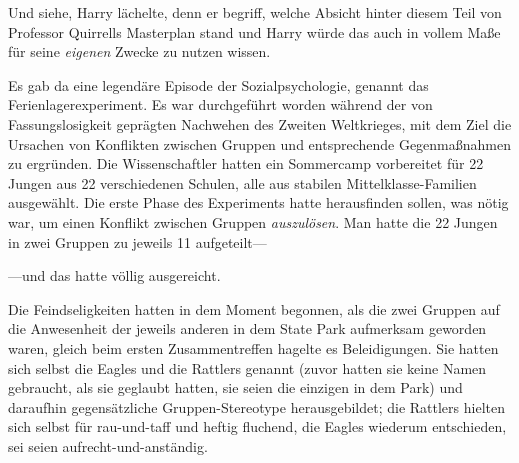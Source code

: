 Und siehe, Harry lächelte, denn er begriff, welche Absicht hinter diesem Teil von Professor Quirrells Masterplan stand und Harry würde das auch in vollem Maße für seine \emph{eigenen} Zwecke zu nutzen wissen.

Es gab da eine legendäre Episode der Sozialpsychologie, genannt das Ferienlagerexperiment. Es war durchgeführt worden während der von Fassungslosigkeit geprägten Nachwehen des Zweiten Weltkrieges, mit dem Ziel die Ursachen von Konflikten zwischen Gruppen und entsprechende Gegenmaßnahmen zu ergründen. Die Wissenschaftler hatten ein Sommercamp vorbereitet für 22 Jungen aus 22 verschiedenen Schulen, alle aus stabilen Mittelklasse-Familien ausgewählt. Die erste Phase des Experiments hatte herausfinden sollen, was nötig war, um einen Konflikt zwischen Gruppen \emph{auszulösen}. Man hatte die 22 Jungen in zwei Gruppen zu jeweils 11 aufgeteilt—

—und das hatte völlig ausgereicht.

Die Feindseligkeiten hatten in dem Moment begonnen, als die zwei Gruppen auf die Anwesenheit der jeweils anderen in dem State Park aufmerksam geworden waren, gleich beim ersten Zusammentreffen hagelte es Beleidigungen. Sie hatten sich selbst die Eagles und die Rattlers genannt (zuvor hatten sie keine Namen gebraucht, als sie geglaubt hatten, sie seien die einzigen in dem Park) und daraufhin gegensätzliche Gruppen-Stereotype herausgebildet; die Rattlers hielten sich selbst für rau-und-taff und heftig fluchend, die Eagles wiederum entschieden, sei seien aufrecht-und-anständig.

